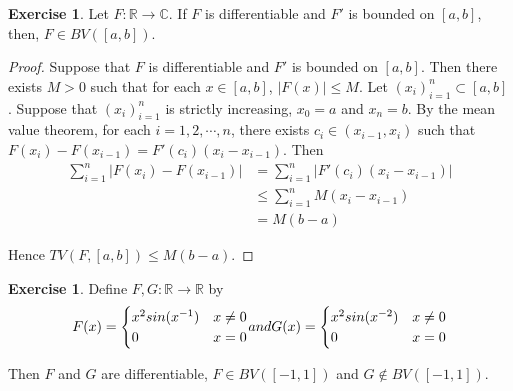 \documentclass[12pt]{amsart}
\theoremstyle{definition}
\newtheorem{ex}[definition]{Exercise}
\newcommand{\C}{\mathbb{C}}
\newcommand{\R}{\mathbb{R}}
\newcommand{\lex}[1]{\label{ex:#1}}
\begin{document}
	\begin{ex} \lex{00000} 
		Let $F:\R \rightarrow \C$. If $F$ is differentiable and $F'$ is bounded on $[a,b]$, then, $F \in BV([a,b])$. 
	\end{ex}
	
	\begin{proof}
		Suppose that $F$ is differentiable and $F'$ is bounded on $[a,b]$. Then there exists $M>0$ such that for each $x \in [a,b]$, $|F(x)| \leq M$. Let $(x_i)_{i=1}^n \subset [a,b]$. Suppose that $(x_i)_{i=1}^n$ is strictly increasing, $x_0=a$ and $x_n=b$. By the mean value theorem, for each $i =1,2, \cdots, n$, there exists $c_i\in (x_{i-1}, x_i)$ such that $F(x_i)-F(x_{i-1})=F'(c_i)(x_i-x_{i-1})$. Then 
		\begin{align*}
			\sum_{i=1}^n|F(x_i)-F(x_{i-1})|
			&= \sum_{i=1}^n|F'(c_i)(x_i-x_{i-1})|\\
			&\leq  \sum_{i=1}^nM(x_i-x_{i-1})\\
			&=M(b-a)
		\end{align*}
		
		Hence $TV(F, [a,b]) \leq M(b-a)$.
	\end{proof}
	
	\begin{ex} \lex{00000} 
		Define $F,G:\R \rightarrow \R$ by 
		\[ F(x) = \begin{cases}
			x^2sin(x^{-1}) & x \neq 0\\
			0 & x=0\\
		\end{cases}$$ and $$G(x)=
		\begin{cases}
			x^2sin(x^{-2}) & x \neq 0\\
			0 & x=0
		\end{cases}
		\]
		
		Then $F$ and $G$ are differentiable, $F \in BV([-1,1])$ and $G \not \in BV([-1,1])$.
	\end{ex}
	
\end{document}
